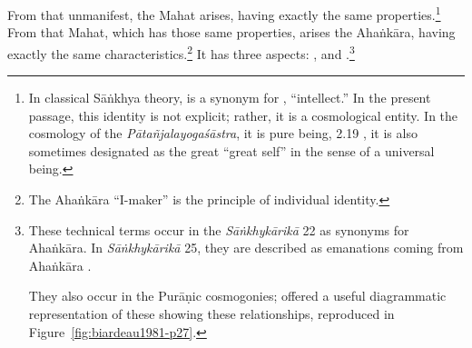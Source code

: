 \begin{translation}
From that unmanifest, the Mahat arises, having exactly the same
properties.\footnote{In classical Sāṅkhya theory,  is a
    synonym for , ``intellect.''  In the present passage, this
    identity is not explicit; rather, it is a cosmological entity.  In the
    cosmology of the \emph{Pātañjalayogaśāstra}, it is pure being,
     2.19 \citep[85]{agas-1904}, it is also sometimes
    designated as the great  ``great self'' in the sense of a
    universal being.} %
    From that Mahat, which has those same properties, arises the
    Ahaṅkāra, having exactly the same characteristics.\footnote{The
        Ahaṅkāra ``I-maker'' is the principle of individual identity.}  It
        has three aspects: , 
        and .\footnote{\label{puraniccosmology}These 
        technical terms occur in the \emph{Sāṅkhykārikā} 22 as synonyms for 
        Ahaṅkāra.  In \emph{Sāṅkhykārikā} 25, they are described as emanations 
        coming from Ahaṅkāra  
        \parencites[46--47, 50]{sast-1948}[187--188, 195--196]{wezl-1998}. 
       
            They 
        also occur in the Purāṇic cosmogonies; \citet[27]{biar-1981} offered a 
        useful diagrammatic representation of these showing these relationships, 
        reproduced in Figure~\ref{fig:biardeau1981-p27}.}
          
            \begin{figure}
                \centering
\end{figure}
\end{translation}
